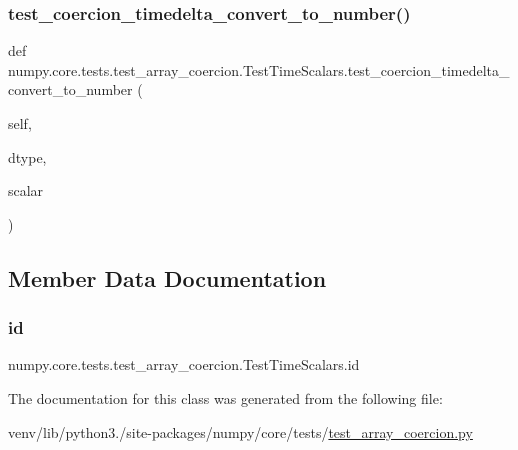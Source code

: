 \subsubsection{\texorpdfstring{test\+\_\+coercion\+\_\+timedelta\+\_\+convert\+\_\+to\+\_\+number()}{test\_coercion\_timedelta\_convert\_to\_number()}}
{\footnotesize\ttfamily def numpy.\+core.\+tests.\+test\+\_\+array\+\_\+coercion.\+Test\+Time\+Scalars.\+test\+\_\+coercion\+\_\+timedelta\+\_\+convert\+\_\+to\+\_\+number (\begin{DoxyParamCaption}\item[{}]{self,  }\item[{}]{dtype,  }\item[{}]{scalar }\end{DoxyParamCaption})}



\subsection{Member Data Documentation}
\mbox{\label{classnumpy_1_1core_1_1tests_1_1test__array__coercion_1_1TestTimeScalars_ac3fb25578c27032225645dcd238cbb2f}} 
\subsubsection{\texorpdfstring{id}{id}}
{\footnotesize\ttfamily numpy.\+core.\+tests.\+test\+\_\+array\+\_\+coercion.\+Test\+Time\+Scalars.\+id\hspace{0.3cm}{\ttfamily [static]}}



The documentation for this class was generated from the following file\+:\begin{DoxyCompactItemize}
\item 
venv/lib/python3./site-\/packages/numpy/core/tests/\hyperlink{test__array__coercion_8py}{test\+\_\+array\+\_\+coercion.\+py}\end{DoxyCompactItemize}
